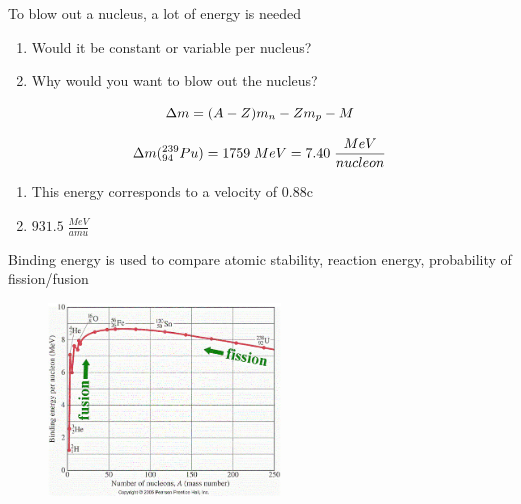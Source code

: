 \documentclass[aspectratio=1610,pdftex,dvipsnames,compress,xcolor={dvipsnames}]{beamer}
\begin{document}
\begin{frame}{To blow out a nucleus, a lot of energy is needed}
    \begin{enumerate}[series=outerlist,topsep=0pt,itemsep=21pt,leftmargin=*,label=(\arabic*)]
        \item[]Would it be constant or variable per nucleus?
        \item[]Why would you want to blow out the nucleus?
    \end{enumerate}

    \begin{equation}
        \LARGE
        \Delta m = (A-Z)m_n - Zm_p - M
    \end{equation}

    \begin{equation}
        \LARGE
        \Delta m(^{239}_{94}Pu) = 1759 \; MeV = 7.40 \; \frac{MeV}{nucleon}
    \end{equation}

    \vspace*{\fill}

    \begin{enumerate}[series=outerlist,topsep=0pt,itemsep=21pt,leftmargin=*,label=(\arabic*)]
        \item[]This energy corresponds to a velocity of 0.88c
        \item[]\LARGE $931.5 \; \frac{MeV}{amu}$
    \end{enumerate}
\end{frame}


\begin{frame}{Binding energy is used to compare atomic stability, reaction energy, probability of fission/fusion}
    \begin{figure}
        \centering
        \href{https://static.wixstatic.com/media/b89a36_1bd87fd3fe5c4d148c7a37c821c5187b~mv2.gif}{\includegraphics[width=0.55\textwidth]{binding.energy.jpg}}
    \end{figure}
\end{frame}
\end{document}
